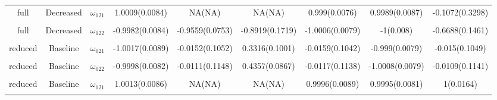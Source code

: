 \documentclass[
]{article}
\begin{document}
\begin{landscape}
\begin{longtable}{ccccccccc}
full & Decreased & $\omega_{121}$ & 1.0009(0.0084) & NA(NA) & NA(NA) & 0.999(0.0076) & 0.9989(0.0087) & -0.1072(0.3298)\\
\addlinespace
\cellcolor{gray!15}{full} & \cellcolor{gray!15}{Decreased} & \cellcolor{gray!15}{$\omega_{112}$} & \cellcolor{gray!15}{1.0005(0.0089)} & \cellcolor{gray!15}{NA(NA)} & \cellcolor{gray!15}{NA(NA)} & \cellcolor{gray!15}{1.0013(0.0085)} & \cellcolor{gray!15}{1.0005(0.0088)} & \cellcolor{gray!15}{-0.859(0.2838)}\\
full & Decreased & $\omega_{122}$ & -0.9982(0.0084) & -0.9559(0.0753) & -0.8919(0.1719) & -1.0006(0.0079) & -1(0.008) & -0.6688(0.1461)\\
\cellcolor{gray!15}{reduced} & \cellcolor{gray!15}{Baseline} & \cellcolor{gray!15}{$\omega_{011}$} & \cellcolor{gray!15}{-1.9997(0.0082)} & \cellcolor{gray!15}{-0.0505(0.1502)} & \cellcolor{gray!15}{-0.5643(0.0867)} & \cellcolor{gray!15}{-0.052(0.1502)} & \cellcolor{gray!15}{-2.0017(0.0072)} & \cellcolor{gray!15}{-0.0528(0.1498)}\\
reduced & Baseline & $\omega_{021}$ & -1.0017(0.0089) & -0.0152(0.1052) & 0.3316(0.1001) & -0.0159(0.1042) & -0.999(0.0079) & -0.015(0.1049)\\
\cellcolor{gray!15}{reduced} & \cellcolor{gray!15}{Baseline} & \cellcolor{gray!15}{$\omega_{012}$} & \cellcolor{gray!15}{-0.4991(0.0081)} & \cellcolor{gray!15}{-0.07(0.1834)} & \cellcolor{gray!15}{-0.5059(0.142)} & \cellcolor{gray!15}{-0.0717(0.1839)} & \cellcolor{gray!15}{-0.501(0.0078)} & \cellcolor{gray!15}{-0.0727(0.183)}\\
\addlinespace
reduced & Baseline & $\omega_{022}$ & -0.9998(0.0082) & -0.0111(0.1148) & 0.4357(0.0867) & -0.0117(0.1138) & -1.0008(0.0079) & -0.0109(0.1141)\\
\cellcolor{gray!15}{reduced} & \cellcolor{gray!15}{Baseline} & \cellcolor{gray!15}{$\omega_{111}$} & \cellcolor{gray!15}{-2.9987(0.0081)} & \cellcolor{gray!15}{-2.9995(0.0374)} & \cellcolor{gray!15}{-3.0006(0.0207)} & \cellcolor{gray!15}{-3.0001(0.0076)} & \cellcolor{gray!15}{-2.9995(0.0082)} & \cellcolor{gray!15}{-2.9986(0.0165)}\\
reduced & Baseline & $\omega_{121}$ & 1.0013(0.0086) & NA(NA) & NA(NA) & 0.9996(0.0089) & 0.9995(0.0081) & 1(0.0164)\\
\cellcolor{gray!15}{reduced} & \cellcolor{gray!15}{Baseline} & \cellcolor{gray!15}{$\omega_{112}$} & \cellcolor{gray!15}{1.0011(0.0082)} & \cellcolor{gray!15}{NA(NA)} & \cellcolor{gray!15}{NA(NA)} & \cellcolor{gray!15}{0.999(0.0081)} & \cellcolor{gray!15}{1.0023(0.0076)} & \cellcolor{gray!15}{1(0.0168)}\\

\end{longtable}
\end{landscape}
\end{document}
